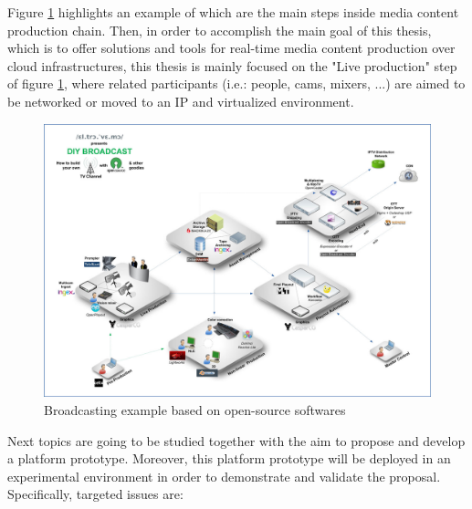 Figure \ref{F:bebooss} highlights an example \cite{bexample} of which are the main steps inside media content production chain. Then, in order to accomplish the main goal of this thesis, which is to offer solutions and tools for real-time media content production over cloud infrastructures, this thesis is mainly focused on the "Live production" step of figure \ref{F:bebooss}, where related participants (i.e.: people, cams, mixers, ...) are aimed to be networked or moved to an IP and virtualized environment.

\begin{figure}[!htb]
\begin{center}
\includegraphics[width=1\textwidth]{./images/DIY_broadcast_platform_exportweb.jpg}
\caption{Broadcasting example based on open-source softwares \cite{bexample}}
\label{F:bebooss}
\end{center}
\end{figure}

Next topics are going to be studied together with the aim to propose and develop a platform prototype. Moreover, this platform prototype will be deployed in an experimental environment in order to demonstrate and validate the proposal. Specifically, targeted issues are:

